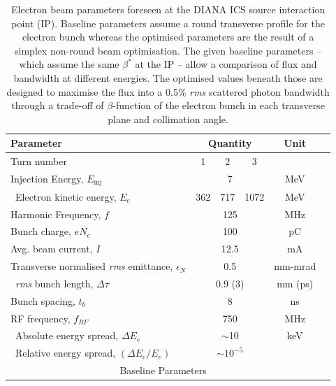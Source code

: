 \documentclass[../main.tex]{subfiles}
\begin{document}
\begin{table}[!h]
\centering
\caption{Electron beam parameters foreseen at the DIANA ICS source interaction point (IP). Baseline parameters assume a round transverse profile for the electron bunch whereas the optimised parameters are the result of a simplex non-round beam optimisation. The given baseline parameters -- which assume the same $\beta^*$ at the IP -- allow a comparison of flux and bandwidth at different energies. The optimised values beneath those are designed to maximise the flux into a 0.5\% \textit{rms} scattered photon bandwidth through a trade-off of $\beta$-function of the electron bunch in each transverse plane and collimation angle.}
\vspace{3mm}
\begin{threeparttable}
\begin{tabular}{lccccc}
\hline\hline
Parameter & \multicolumn{3}{c}{Quantity} & Unit \\
\hline
Turn number & 1 & 2 & 3  \\
Injection Energy, $E_{\mathrm{inj}}$ & \multicolumn{3}{c}{7} & \si{\mega\electronvolt}\\
\tnote{$\dagger$}~Electron kinetic energy, $E_e$ & 362 & 717 & 1072 & \si{\mega\electronvolt}\\
Harmonic Frequency, $f$ & \multicolumn{3}{c}{125} & \si{\mega\hertz}\\
Bunch charge, $e N_e$ & \multicolumn{3}{c}{100} & \si{\pico\coulomb} \\
Avg. beam current, $I$ & \multicolumn{3}{c}{12.5} & \si{\milli\ampere} \\
Transverse normalised \textit{rms} emittance, $\epsilon_{N}$ & \multicolumn{3}{c}{0.5} & \si{\milli\meter}-\si{\milli\radian}\\
\tnote{$\sharp$}~\textit{rms} bunch length, $\Delta \tau$ & \multicolumn{3}{c}{0.9 (3)} & \si{\milli\meter} (\si{\pico\second})\\
Bunch spacing, $t_{b}$ & \multicolumn{3}{c}{8} & \si{\nano\second} \\
RF frequency, $f_{RF}$ & \multicolumn{3}{c}{750} & \si{\mega\hertz} \\
\tnote{*}~Absolute energy spread, $\Delta E_{e}$ & \multicolumn{3}{c}{$\sim$10} & \si{\kilo\electronvolt} \\ 
\tnote{*}~Relative energy spread, $\left(\Delta E_{e}/E_{e}\right)$ & \multicolumn{3}{c}{$\sim10^{-5}$} & \\
\hline
\multicolumn{5}{c}{Baseline Parameters} \\

\end{tabular}
\end{threeparttable}
\end{table}
\end{document}
